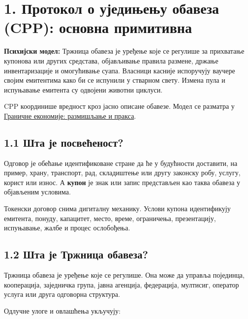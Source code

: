 \documentclass[11pt]{article}
\begin{document}
\section*{1. Протокол о уједињењу обавеза (CPP): основна примитивна}

\textbf{Психијски модел:} Тржница обавеза је уређење које се регулише за прихватање купонова или других средстава, објављивање правила размене, држање инвентаризације и омогућивање суапа. Власници касније испоручују ваучере својим емитентима како би се испунили у стварном свету. Измена пула и испуњавање емитента су одвојени животни циклуси.

CPP координише вредност кроз јасно описане обавезе. Модел се разматра у \href{https://willruddick.substack.com/p/grassroots-economics-the-book-is}{Граничне економије: размишљање и пракса}.

\subsection*{1.1 Шта је посвећеност?}

Одговор је обећање идентификоване стране да ће у будућности доставити, на пример, храну, транспорт, рад, складиштење или другу законску робу, услугу, корист или износ. А \textbf{купон} је знак или запис представљен као таква обавеза у објављеним условима.

Токенски договор снима дигиталну механику. Услови купона идентификују емитента, понуду, капацитет, место, време, ограничења, презентацију, испуњавање, жалбе и процес ослобођења.

\subsection*{1.2 Шта је Тржница обавеза?}

Тржница обавеза је уређење које се регулише. Она може да управља појединца, кооперација, заједничка група, јавна агенција, федерација, мултисиг, оператор услуга или друга одговорна структура.

Одлучне улоге и овлашћења укључују:
\end{document}
